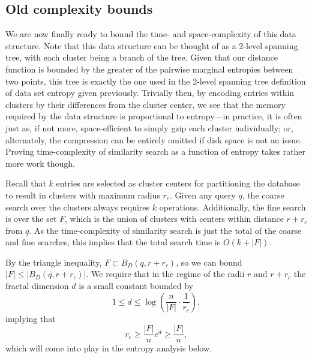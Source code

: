 \documentclass[review,preprint,12pt]{elsarticle}
\theoremstyle{definition}
\theoremstyle{remark}
\numberwithin{equation}{section}
\begin{document}
\subsection{Old complexity bounds}

We are now finally ready to bound the time- and space-complexity of this data structure.
Note that this data structure can be thought of as a 2-level spanning tree, with each cluster being a branch of the tree.
Given that our distance function is bounded by the greater of the pairwise marginal entropies between two points, this tree is exactly the one used in the 2-level spanning tree definition of data set entropy given previously.
Trivially then, by encoding entries within clusters by their differences from the cluster center, we see that the memory required by the data structure is proportional to entropy---in practice, it is often just as, if not more, space-efficient to simply gzip each cluster individually; or, alternately, the compression can be entirely omitted if disk space is not an issue.
Proving time-complexity of similarity search as a function of entropy takes rather more work though.

Recall that $k$ entries are selected as cluster centers for partitioning the database to result in clusters with maximum radius $r_c$.
Given any query $q$, the coarse search over the clusters always requires $k$ operations.
Additionally, the fine search is over the set $F$, which is the union of clusters with centers within distance $r+r_c$ from $q$.
As the time-complexity of similarity search is just the total of the coarse and fine searches, this implies that the total search time is $O(k + |F|)$.

By the triangle inequality, $F \subset B_D(q,r+r_c)$,
so we can bound $|F| \le |B_D(q,r+r_c)|$.
We require that in the regime of the radii $r$ and $r+r_c$ the fractal dimension $d$ is a small constant bounded by
\[
    1 \le d \le \log \left( \frac{n}{|F|} \cdot \frac{1}{r_c} \right), 
\]
implying that
\[
    r_c \ge \frac{|F|}{n} e^d \ge \frac{|F|}{n} ,
\]
which will come into play in the entropy analysis below.
\end{document}

